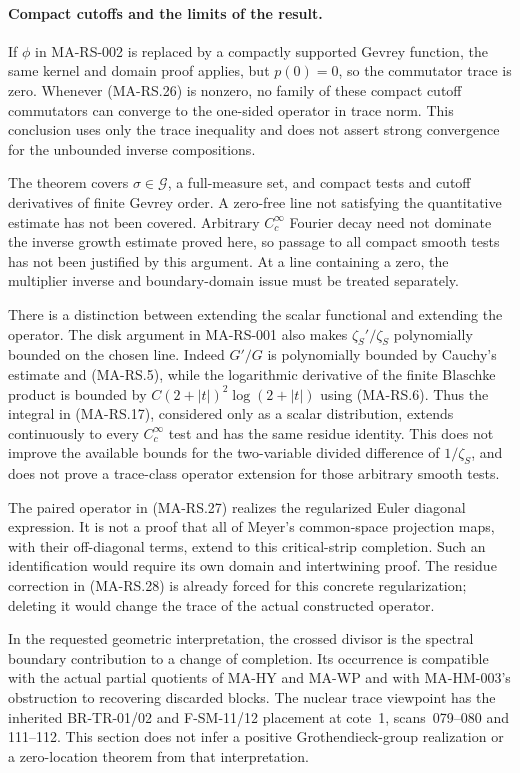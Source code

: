 \paragraph{Compact cutoffs and the limits of the result.}
If $\phi$ in MA-RS-002 is replaced by a compactly supported
Gevrey function, the same kernel and domain proof applies,
but $p(0)=0$, so the commutator trace is zero.
Whenever (MA-RS.26) is nonzero, no family of these compact
cutoff commutators can converge to the one-sided operator
in trace norm.  This conclusion uses only the trace
inequality and does not assert strong convergence for
the unbounded inverse compositions.

The theorem covers $\sigma\in\mathscr G$, a full-measure
set, and compact tests and cutoff derivatives of finite
Gevrey order.  A zero-free line not satisfying the
quantitative estimate has not been covered.  Arbitrary
$C_c^\infty$ Fourier decay need not dominate the inverse
growth estimate proved here, so passage to all compact
smooth tests has not been justified by this argument.
At a line containing a zero, the multiplier inverse
and boundary-domain issue must be treated separately.

There is a distinction between extending the scalar functional
and extending the operator.  The disk argument in MA-RS-001
also makes $\zeta_S'/\zeta_S$ polynomially bounded on the
chosen line.  Indeed $G'/G$ is polynomially bounded by
Cauchy's estimate and (MA-RS.5), while the logarithmic
derivative of the finite Blaschke product is bounded by
$C(2+|t|)^2\log(2+|t|)$ using (MA-RS.6).
Thus the integral in (MA-RS.17), considered only as a
scalar distribution, extends continuously to every
$C_c^\infty$ test and has the same residue identity.
This does not improve the available bounds for the
two-variable divided difference of $1/\zeta_S$, and
does not prove a trace-class operator extension for
those arbitrary smooth tests.

The paired operator in (MA-RS.27) realizes the regularized
Euler diagonal expression.  It is not a proof that all
of Meyer's common-space projection maps, with their
off-diagonal terms, extend to this critical-strip
completion.  Such an identification would require its
own domain and intertwining proof.  The residue correction
in (MA-RS.28) is already forced for this concrete
regularization; deleting it would change the trace of
the actual constructed operator.

In the requested geometric interpretation, the crossed
divisor is the spectral boundary contribution to a change
of completion.  Its occurrence is compatible with the
actual partial quotients of MA-HY and MA-WP and with
MA-HM-003's obstruction to recovering discarded blocks.
The nuclear trace viewpoint has the inherited
BR-TR-01/02 and F-SM-11/12 placement at cote~1,
scans~079--080 and 111--112.  This section does not infer
a positive Grothendieck-group realization or a
zero-location theorem from that interpretation.

